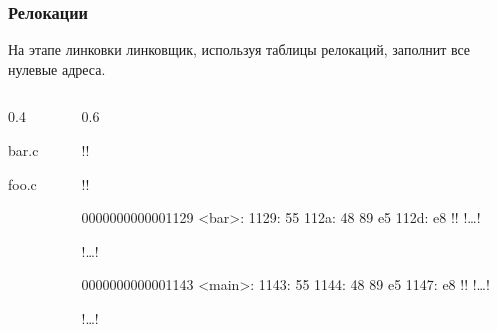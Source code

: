 \documentclass[compress, 8pt, aspectratio=169]{beamer}
\begin{document}

\begin{frame}[fragile]

    \frametitle{Релокации}

    На этапе линковки линковщик, используя таблицы релокаций,
    заполнит все нулевые адреса.

    \begin{columns}[T]

        \begin{column}{0.4\textwidth}

                {bar.c}

                {foo.c}

        \end{column}

        \begin{column}{0.6\textwidth}

            \begin{terminalwindow}
!!

!!

0000000000001129 <bar>:
    1129:       55
    112a:       48 89 e5
    112d:       e8 !!
    !\dots!

!\dots!

0000000000001143 <main>:
    1143:       55
    1144:       48 89 e5
    1147:       e8 !!
    !\dots!

!\dots!
            \end{terminalwindow}

        \end{column}

    \end{columns}

\end{frame}

\end{document}
